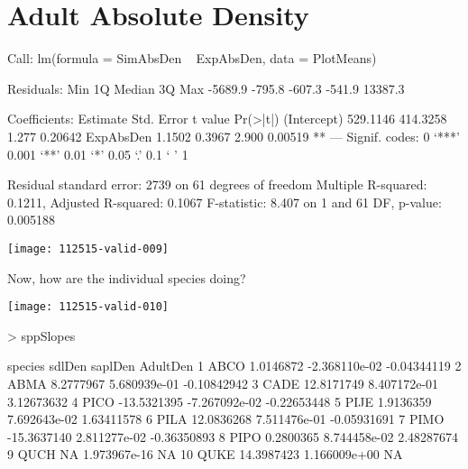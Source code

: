 \documentclass{article}
\begin{document}
\section{Adult Absolute Density}
\begin{Schunk}
\begin{Soutput}
Call:
lm(formula = SimAbsDen ~ ExpAbsDen, data = PlotMeans)

Residuals:
    Min      1Q  Median      3Q     Max 
-5689.9  -795.8  -607.3  -541.9 13387.3 

Coefficients:
            Estimate Std. Error t value Pr(>|t|)   
(Intercept) 529.1146   414.3258   1.277  0.20642   
ExpAbsDen     1.1502     0.3967   2.900  0.00519 **
---
Signif. codes:  0 ‘***’ 0.001 ‘**’ 0.01 ‘*’ 0.05 ‘.’ 0.1 ‘ ’ 1

Residual standard error: 2739 on 61 degrees of freedom
Multiple R-squared:  0.1211,	Adjusted R-squared:  0.1067 
F-statistic: 8.407 on 1 and 61 DF,  p-value: 0.005188
\end{Soutput}
\end{Schunk}
\texttt{[image: 112515-valid-009]}

Now, how are the individual species doing?

\texttt{[image: 112515-valid-010]}
\begin{Schunk}
\begin{Sinput}
>   sppSlopes
\end{Sinput}
\begin{Soutput}
   species      sdlDen       saplDen    AdultDen
1     ABCO   1.0146872 -2.368110e-02 -0.04344119
2     ABMA   8.2777967  5.680939e-01 -0.10842942
3     CADE  12.8171749  8.407172e-01  3.12673632
4     PICO -13.5321395 -7.267092e-02 -0.22653448
5     PIJE   1.9136359  7.692643e-02  1.63411578
6     PILA  12.0836268  7.511476e-01 -0.05931691
7     PIMO -15.3637140  2.811277e-02 -0.36350893
8     PIPO   0.2800365  8.744458e-02  2.48287674
9     QUCH          NA  1.973967e-16          NA
10    QUKE  14.3987423  1.166009e+00          NA
\end{Soutput}
\end{Schunk}




\newpage
\end{document}
